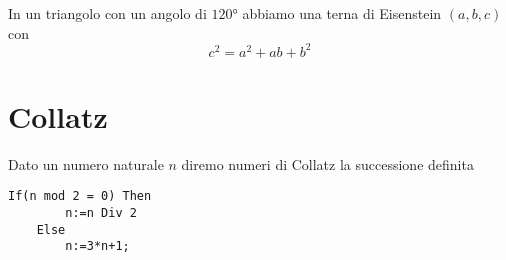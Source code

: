 In un triangolo con un angolo  di $\ang{120}$
abbiamo una terna di Eisenstein $(a,b,c)$ con
\begin{equation*}
	c^2=a^2+ab+b^2
\end{equation*}
\section{Collatz}
\begin{defn}
Dato un numero naturale $n$ diremo numeri di Collatz la successione definita
\end{defn}
 \begin{lstlisting}[style=pascalstyle]
	If(n mod 2 = 0) Then
		n:=n Div 2
	Else
	   	n:=3*n+1;  
\end{lstlisting}